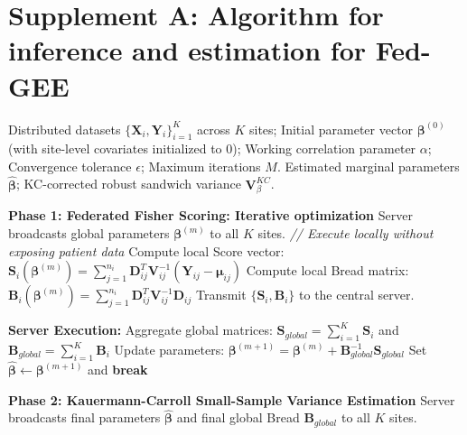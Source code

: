 \documentclass[useAMS,referee, usegraphicx]{biom}
\begin{document}
\section{Supplement A: Algorithm for inference and estimation for Fed-GEE}\label{app:algo}
\begin{algorithm}
\footnotesize
\label{alg:fedgee}
\begin{algorithmic}[1]
\REQUIRE 
    Distributed datasets $\{\mathbf{X}_i, \mathbf{Y}_i\}_{i=1}^K$ across $K$ sites; 
    Initial parameter vector $\boldsymbol{\beta}^{(0)}$ (with site-level covariates initialized to 0); 
    Working correlation parameter $\alpha$; 
    Convergence tolerance $\epsilon$; 
    Maximum iterations $M$.
\ENSURE 
    Estimated marginal parameters $\hat{\boldsymbol{\beta}}$; 
    KC-corrected robust sandwich variance $\mathbf{V}_{\beta}^{KC}$.

\STATE \textbf{Phase 1: Federated Fisher Scoring: Iterative optimization}
    \STATE Server broadcasts global parameters $\boldsymbol{\beta}^{(m)}$ to all $K$ sites.
        \STATE \textit{// Execute locally without exposing patient data}
        \STATE Compute local Score vector: $\mathbf{S}_i\left(\boldsymbol{\beta}^{(m)}\right) = \sum_{j=1}^{n_i} \mathbf{D}_{ij}^T \mathbf{V}_{ij}^{-1} \left(\mathbf{Y}_{ij} - \boldsymbol{\mu}_{ij}\right)$
        \STATE Compute local Bread matrix: $\mathbf{B}_i\left(\boldsymbol{\beta}^{(m)}\right) = \sum_{j=1}^{n_i} \mathbf{D}_{ij}^T \mathbf{V}_{ij}^{-1} \mathbf{D}_{ij}$
        \STATE Transmit $\{\mathbf{S}_i, \mathbf{B}_i\}$ to the central server.
    \ENDFOR
    
    \STATE \textbf{Server Execution:}
    \STATE Aggregate global matrices: $\mathbf{S}_{global} = \sum_{i=1}^K \mathbf{S}_i$ and $\mathbf{B}_{global} = \sum_{i=1}^K \mathbf{B}_i$
    \STATE Update parameters: $\boldsymbol{\beta}^{(m+1)} = \boldsymbol{\beta}^{(m)} + \mathbf{B}_{global}^{-1} \mathbf{S}_{global}$
        \STATE Set $\hat{\boldsymbol{\beta}} \leftarrow \boldsymbol{\beta}^{(m+1)}$ and \textbf{break}
    \ENDIF
\ENDFOR

\STATE \textbf{Phase 2: Kauermann-Carroll Small-Sample Variance Estimation}
\STATE Server broadcasts final parameters $\hat{\boldsymbol{\beta}}$ and final global Bread $\mathbf{B}_{global}$ to all $K$ sites.


\end{algorithmic}
\end{algorithm}
\end{document}
